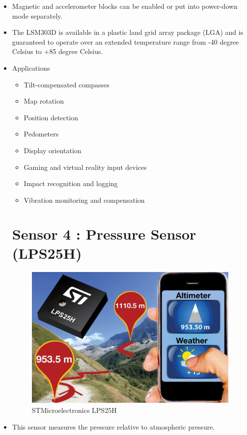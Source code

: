 \documentclass[11pt,a4paper]{article}
\begin{document}
\begin{itemize}
\item Magnetic and accelerometer blocks can be
enabled or put into power-down mode separately.
\item The LSM303D is available in a plastic land grid
array package (LGA) and is guaranteed to
operate over an extended temperature range
from -40 degree Celsius to +85 degree Celsius.

\item Applications
\begin{itemize}

\item Tilt-compensated compasses
\item Map rotation
\item Position detection


\item Pedometers

\item Display orientation
\item Gaming and virtual reality input devices
\item Impact recognition and logging
\item Vibration monitoring and compensation

\end{itemize}

\newpage
\section{Sensor 4 : Pressure Sensor (LPS25H)}
\begin{figure}[h]
    \centering
	\includegraphics[scale=0.25]{LPS25H.jpg}
	\caption {STMicroelectronics LPS25H}
	\end{figure}
\item This sensor measures the pressure relative to atmospheric pressure. 


\end{itemize}
\end{document}
